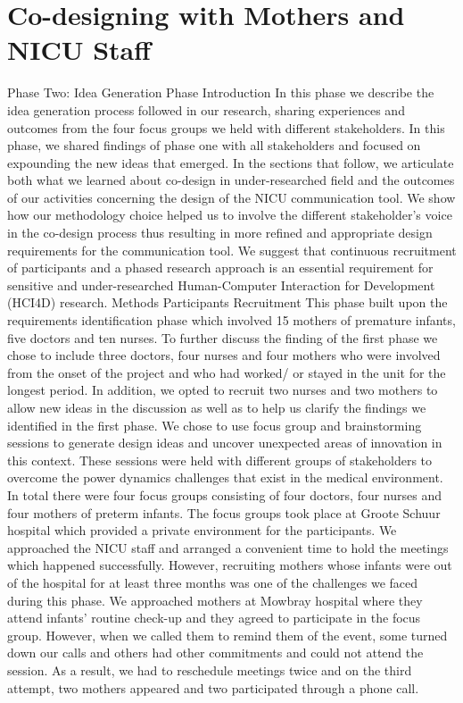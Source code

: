 
\chapter{Co-designing with Mothers and NICU Staff} %

\label{Chapter5} %


Phase Two: Idea Generation Phase
Introduction
In this phase we describe the idea generation process followed in our research, sharing experiences and outcomes from the four focus groups we held with different stakeholders. In this phase, we shared findings of phase one with all stakeholders and focused on expounding the new ideas that emerged. In the sections that follow, we articulate both what we learned about co-design in under-researched field and the outcomes of our activities concerning the design of the NICU communication tool. We show how our methodology choice helped us to involve the different stakeholder's voice in the co-design process thus resulting in more refined and appropriate design requirements for the communication tool. We suggest that continuous recruitment of participants and a phased research approach is an essential requirement for sensitive and under-researched Human-Computer Interaction for Development (HCI4D) research.
Methods
Participants Recruitment
This phase built upon the requirements identification phase which involved 15 mothers of premature infants, five doctors and ten nurses. To further discuss the finding of the first phase we chose to include three doctors, four nurses and four mothers who were involved from the onset of the project and who had worked/ or stayed in the unit for the longest period. In addition, we opted to recruit two nurses and two mothers to allow new ideas in the discussion as well as to help us clarify the findings we identified in the first phase. We chose to use focus group and brainstorming sessions to generate design ideas and uncover unexpected areas of innovation in this context. These sessions were held with different groups of stakeholders to overcome the power dynamics challenges that exist in the medical environment. In total there were four focus groups consisting of four doctors, four nurses and four mothers of preterm infants.
The focus groups took place at Groote Schuur hospital which provided a private environment for the participants.  We approached the NICU staff and arranged a convenient time to hold the meetings which happened successfully. However, recruiting mothers whose infants were out of the hospital for at least three months was one of the challenges we faced during this phase. We approached mothers at Mowbray hospital where they attend infants’ routine check-up and they agreed to participate in the focus group. However, when we called them to remind them of the event, some turned down our calls and others had other commitments and could not attend the session. As a result, we had to reschedule meetings twice and on the third attempt, two mothers appeared and two participated through a phone call.
